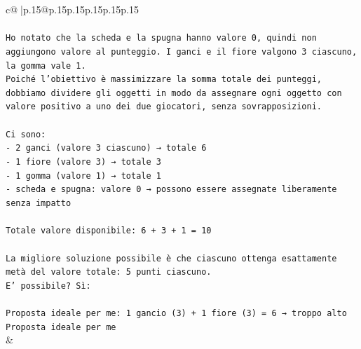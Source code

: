 \documentclass{article}
\begin{document}
{\begin{supertabular}{c@{$\;$}|p{.15\linewidth}@{}p{.15\linewidth}p{.15\linewidth}p{.15\linewidth}p{.15\linewidth}p{.15\linewidth}}
{{{\\ 
\\ 
\texttt{Ho notato che la scheda e la spugna hanno valore 0, quindi non aggiungono valore al punteggio. I ganci e il fiore valgono 3 ciascuno, la gomma vale 1.  } \\
\texttt{Poiché l'obiettivo è massimizzare la somma totale dei punteggi, dobbiamo dividere gli oggetti in modo da assegnare ogni oggetto con valore positivo a uno dei due giocatori, senza sovrapposizioni.  } \\
\\ 
\texttt{Ci sono:  } \\
\texttt{{-} 2 ganci (valore 3 ciascuno) → totale 6  } \\
\texttt{{-} 1 fiore (valore 3) → totale 3  } \\
\texttt{{-} 1 gomma (valore 1) → totale 1  } \\
\texttt{{-} scheda e spugna: valore 0 → possono essere assegnate liberamente senza impatto  } \\
\\ 
\texttt{Totale valore disponibile: 6 + 3 + 1 = 10  } \\
\\ 
\texttt{La migliore soluzione possibile è che ciascuno ottenga esattamente metà del valore totale: 5 punti ciascuno.  } \\
\texttt{E’ possibile? Sì:  } \\
\\ 
\texttt{Proposta ideale per me: 1 gancio (3) + 1 fiore (3) = 6 → troppo alto  } \\
\texttt{Proposta ideale per me} \\
            }
        }
    }
    & \\ \\


\end{supertabular}}
\end{document}
